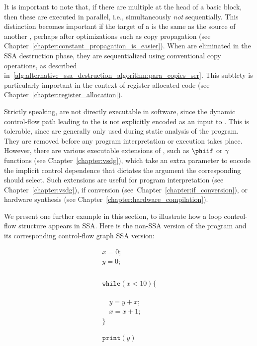 It is important to note that, if there are multiple \phifuns{} at the head of a basic block, then these are executed in parallel, i.e., simultaneously \textit{not} sequentially. 
This distinction becomes important if the target of a \phifun is the same as the source of another \phifun, perhaps after optimizations such as copy propagation \ifconstantprop (see Chapter~\ref{chapter:constant_propagation_is_easier})\fi. 
When \phifuns are eliminated in the SSA destruction phase, they are sequentialized using conventional copy operations, as described in~\ref{alg:alternative_ssa_destruction_algorithm:para_copies_ser}. 
This subtlety is particularly important in the context of register allocated code \ifregin (see Chapter~\ref{chapter:register_allocation})\fi.

Strictly speaking, \phifuns are not directly executable in software, since the dynamic control-flow path leading to the \phifun is not explicitly encoded as an input to \phifun. 
This is tolerable, since \phifuns are generally only used during static analysis of the program. 
They are removed before any program interpretation or execution takes place. 
However, there are various executable extensions of \phifuns, such as $\phiif$ or $\gamma$ functions (see Chapter~\ref{chapter:vsdg}), which take an extra parameter to encode the implicit control dependence that dictates the argument the corresponding \phifun should select. %
Such extensions are useful for program interpretation (see Chapter~\ref{chapter:vsdg}), if conversion (see~Chapter~\ref{chapter:if_conversion}), or hardware synthesis (see Chapter~\ref{chapter:hardware_compilation}).

We present one further example in this section, to illustrate how a loop control-flow structure appears in SSA. 
Here is the non-SSA version of the program and its corresponding control-flow graph SSA version:
\medskip

\begin{minipage}{0.5\textwidth}
\begin{equation*}
\begin{array}{l}
x = 0;\\
y = 0;\\
~\\\\\\\\
\texttt{while} (x < 10) \{\\
~\\\\\\
\quad  y = y + x;\\
\quad  x = x + 1;\\
\}\\
~\\\\
\texttt{print}(y)
\end{array} 
\end{equation*}
\end{minipage}
\begin{minipage}{0.4\textwidth}
\end{minipage}
\bigskip

